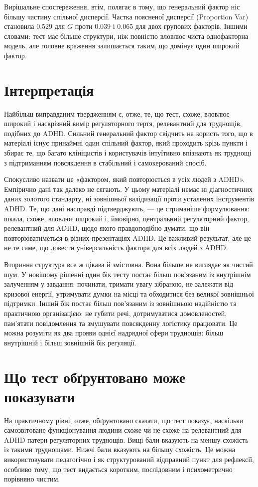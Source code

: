 \documentclass[11pt,a4paper]{article}
\begin{document}
Вирішальне спостереження, втім, полягає в тому, що генеральний фактор ніс більшу частину спільної дисперсії. Частка поясненої дисперсії (Proportion Var) становила 0.529 для $G$ проти 0.039 і 0.065 для двох групових факторів. Іншими словами: тест має більше структури, ніж повністю вловлює чиста однофакторна модель, але головне враження залишається таким, що домінує один широкий фактор.

\section{Інтерпретація}
Найбільш виправданим твердженням є, отже, те, що тест, схоже, вловлює широкий і наскрізний вимір регуляторного тертя, релевантний для труднощів, подібних до ADHD. Сильний генеральний фактор свідчить на користь того, що в матеріалі існує принаймні один спільний фактор, який проходить крізь пункти і збирає те, що багато клініцистів і користувачів інтуїтивно впізнають як труднощі з підтриманням повсякдення в стабільний і самокерований спосіб.

Спокусливо назвати це «фактором, який повторюється в усіх людей з ADHD». Емпірично дані так далеко не сягають. У цьому матеріалі немає ні діагностичних даних золотого стандарту, ні зовнішньої валідизації проти усталених інструментів ADHD. Те, що дані насправді підтверджують, --- це стриманіше формулювання: шкала, схоже, вловлює широкий і, ймовірно, центральний регуляторний фактор, релевантний для ADHD, щодо якого правдоподібно думати, що він повторюватиметься в різних презентаціях ADHD. Це важливий результат, але це не те саме, що довести універсальність фактора для всіх людей з ADHD.

Вторинна структура все ж цікава й змістовна. Вона більше не виглядає як чистий шум. У новішому рішенні один бік тесту постає більш пов'язаним із внутрішнім залученням у завдання: починати, тримати увагу зібраною, не залежати від кризової енергії, утримувати думки на місці та обходитися без великої зовнішньої підтримки. Інший бік постає більш пов'язаним із зовнішньою надійністю та практичною організацією: не губити речі, дотримуватися домовленостей, пам'ятати повідомлення та змушувати повсякденну логістику працювати. Це можна розуміти як два прояви однієї надрядної сфери труднощів: більш внутрішній і більш зовнішній бік регуляції.

\section{Що тест обґрунтовано може показувати}
На практичному рівні, отже, обґрунтовано сказати, що тест показує, наскільки самозвітоване функціонування людини схоже чи не схоже на релевантний для ADHD патерн регуляторних труднощів. Вищі бали вказують на меншу схожість із такими труднощами. Нижчі бали вказують на більшу схожість. Це можна використовувати педагогічно і як структурований відправний пункт для рефлексії, особливо тому, що тест видається коротким, послідовним і психометрично порівняно чистим.
\end{document}
